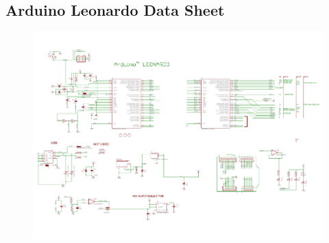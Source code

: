 \documentclass{article}
\begin{document}
\begin{appendices}
		\section{Arduino Leonardo Data Sheet}
			\begin{figure}[H]
				\centering
				\label{LeoDatasheet}
				\includegraphics*[scale = 0.75,angle=90]{ArduinoLeonardoDataSheet}
			\end{figure}
				
		
		
		
		\newpage
	
		
		
	
		\newpage	
		 		
	\end{appendices}
\end{document}
